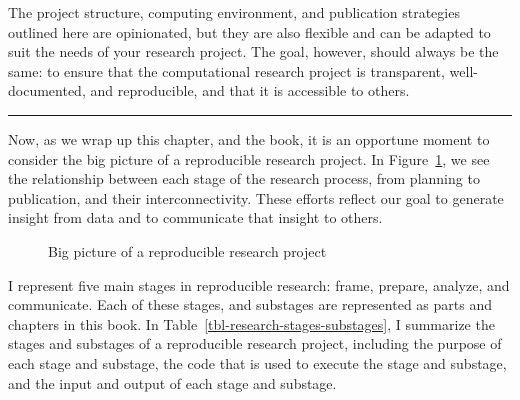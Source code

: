 \documentclass[
  letterpaper,
  krantz1]{latex/krantz-mod}
\theoremstyle{definition}
\theoremstyle{definition}
\theoremstyle{remark}
\begin{document}
The project structure, computing environment, and publication strategies
outlined here are opinionated, but they are also flexible and can be
adapted to suit the needs of your research project. The goal, however,
should always be the same: to ensure that the computational research
project is transparent, well-documented, and reproducible, and that it
is accessible to others.

\pagebreak

\begin{center}\rule{0.5\linewidth}{0.5pt}\end{center}

Now, as we wrap up this chapter, and the book, it is an opportune moment
to consider the big picture of a reproducible research project. In
Figure~\ref{fig-big-picture}, we see the relationship between each stage
of the research process, from planning to publication, and their
interconnectivity. These efforts reflect our goal to generate insight
from data and to communicate that insight to others.

\begin{figure}[!htb]


\caption{\label{fig-big-picture}Big picture of a reproducible research
project}

\end{figure}%

I represent five main stages in reproducible research: frame, prepare,
analyze, and communicate. Each of these stages, and substages are
represented as parts and chapters in this book. In
Table~\ref{tbl-research-stages-substages}, I summarize the stages and
substages of a reproducible research project, including the purpose of
each stage and substage, the code that is used to execute the stage and
substage, and the input and output of each stage and substage.
\end{document}
